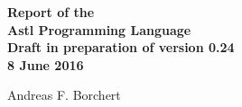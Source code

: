 \begin{titlepage}
   \begin{flushright}
      {\Huge \bfseries
	 Report of the \\
	 Astl Programming Language \\
	 Draft in preparation of version 0.24 \\
	 8 June 2016 \\
      }

      \vspace*{\fill}

      {\huge
	 Andreas F. Borchert \\
      }
   \end{flushright}
\end{titlepage}
